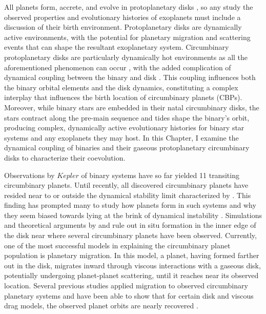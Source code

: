 All planets form, accrete, and evolve in protoplanetary disks \citep[e.g.][]{Lin1996,Nelson2000,Papaloizou2006,Rogers2011,Bodenheimer2014}, so any study the observed properties and evolutionary histories of exoplanets must include a discussion of their birth environment.  Protoplanetary disks are dynamically active environments, with the potential for planetary migration and scattering events that can shape the resultant exoplanetary system.  Circumbinary protoplanetary disks are particularly dynamically hot environments as all the aforementioned phenomenon can occur \citep[e.g.][]{Pierens2013}, with the added complication of dynamical coupling between the binary and disk \citep{Papaloizou2001}.  This coupling influences both the binary orbital elements and the disk dynamics, constituting a complex interplay that influences the birth location of circumbinary planets (CBPs).  Moreover, while binary stars are embedded in their natal circumbinary disks, the stars contract along the pre-main sequence and tides shape the binary's orbit, producing complex, dynamically active evolutionary histories for binary star systems and any exoplanets they may host.  In this Chapter, I examine the dynamical coupling of binaries and their gaseous protoplanetary circumbinary disks to characterize their coevolution.

Observations by $Kepler$ of binary systems have so far yielded 11 transiting circumbinary planets.  Until recently, all discovered circumbinary planets have resided near to or outside the dynamical stability limit characterized by \citet{Dvorak1986,Holman1999}.  This
finding has prompted many to study how planets form in such systems and why they seem biased towards lying at the brink of dynamical instability \citep{Welsh2014,Pierens2013}.  Simulations and theoretical arguments by \citet{Pelupessy2013} and \citet{Bromley2015} rule out in situ formation
in the inner edge of the disk near where several circumbinary planets have been observed.  Currently, one of the most successful models in explaining the circumbinary planet population is planetary migration.  
In this model, a planet, having formed farther out in the disk, migrates inward through viscous interactions with a gaseous disk, potentially undergoing planet-planet scattering, until it reaches near its observed location.  Several previous studies applied migration to observed circumbinary planetary systems and have been able to show that for certain disk and viscous drag models, the observed planet orbits are nearly recovered \citep[e.g.][]{Kley2014,Kley2015,Pierens2007,Pierens2013}.

